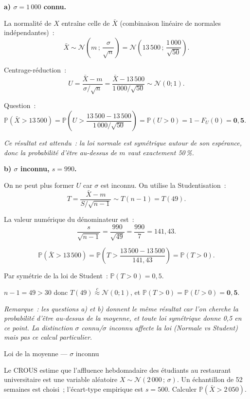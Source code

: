 \documentclass[11pt,a4paper]{article}
\newcommand{\N}{\mathcal{N}}
\newcommand{\Prob}{\mathbb{P}}
\newcommand{\appN}{\overset{c}{\approx}}
\renewcommand{\P}{\Prob}
\begin{document}
\textbf{a) $\sigma = 1\,000$ connu.}

La normalit\'e de $X$ entra\^ine celle de $\bar{X}$ (combinaison lin\'eaire de normales ind\'ependantes)~:
$$\bar{X} \sim \N\!\left(m\,;\,\frac{\sigma}{\sqrt{n}}\right) = \N\!\left(13\,500\,;\,\frac{1\,000}{\sqrt{50}}\right).$$

Centrage-r\'eduction~:
$$U = \frac{\bar{X} - m}{\sigma/\sqrt{n}} = \frac{\bar{X}-13\,500}{1\,000/\sqrt{50}} \sim \N(0;1).$$

Question~: $\P(\bar{X} > 13\,500) = \P\!\left(U > \dfrac{13\,500-13\,500}{1\,000/\sqrt{50}}\right) = \P(U>0) = 1 - F_U(0) = \mathbf{0{,}5}.$

\smallskip
\textit{Ce r\'esultat est attendu~: la loi normale est sym\'etrique autour de son esp\'erance, donc la probabilit\'e d'\^etre au-dessus de $m$ vaut exactement 50\,\%.}

\medskip
\textbf{b) $\sigma$ inconnu, $s = 990$.}

On ne peut plus former $U$ car $\sigma$ est inconnu. On utilise la Studentisation~:
$$T = \frac{\bar{X}-m}{S/\sqrt{n-1}} \sim T(n-1) = T(49).$$

La valeur num\'erique du d\'enominateur est~:
$$\frac{s}{\sqrt{n-1}} = \frac{990}{\sqrt{49}} = \frac{990}{7} = 141{,}43.$$

$$\P(\bar{X}>13\,500) = \P\!\left(T > \frac{13\,500-13\,500}{141{,}43}\right) = \P(T>0).$$

Par sym\'etrie de la loi de Student~: $\P(T>0) = 0{,}5$.

\begin{methbox}[Convergence]
$n-1=49>30$ donc $T(49)\appN\N(0;1)$, et $\P(T>0) = \P(U>0) = \mathbf{0{,}5}$.
\end{methbox}

\textit{Remarque~: les questions a) et b) donnent le m\^eme r\'esultat car l'on cherche la probabilit\'e d'\^etre au-dessus de la moyenne, et toute loi sym\'etrique donne 0,5 en ce point. La distinction $\sigma$ connu/$\sigma$ inconnu affecte la loi (Normale vs Student) mais pas ce calcul particulier.}

\begin{exercice}{Loi de la moyenne --- $\sigma$ inconnu}

Le CROUS estime que l'affluence hebdomadaire des \'etudiants au restaurant universitaire
est une variable al\'eatoire $X \sim \N(2\,000\,;\,\sigma)$. Un \'echantillon de 52 semaines
est choisi~; l'\'ecart-type empirique est $s=500$. Calculer $\P(\bar{X} > 2\,050)$.
\end{exercice}
\end{document}
